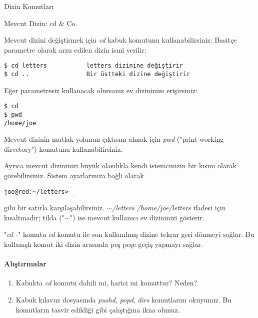 \begin{section}{Dizin Komutları}
\begin{subsection}{Mevcut Dizin: cd \& Co.}

Mevcut dizini değiştirmek için \emph{cd} kabuk komutunu kullanabilirsiniz: Basitçe parametre olarak arzu edilen dizin ismi verilir:
\footnotesize
\begin{verbatim}
$ cd letters 	       letters dizinine değiştirir
$ cd .. 			   Bir üstteki dizine değiştirir
\end{verbatim}
\normalsize 

Eğer parametresiz kullanacak olursanız ev dizininize erişirsiniz:
\footnotesize
\begin{verbatim}
$ cd
$ pwd
/home/joe
\end{verbatim}
\normalsize 

Mevcut dizinin mutlak yolunun çıktısını almak için \emph{pwd} ("print working directory") komutunu kullanabilirsiniz.

Ayrıca mevcut dizininizi büyük olasılıkla kendi istemcinizin bir kısmı olarak görebilirsiniz. Sistem ayarlarınıza bağlı olarak

\footnotesize
\begin{verbatim}
joe@red:~/letters> _
\end{verbatim}
\normalsize 

gibi bir satırla karşılaşabilirsiniz. \emph{$\sim$/letters} \emph{/home/joe/letters} ifadesi için kısaltmadır; tilda ("\emph{$\sim$}") ise mevcut kullanıcı ev dizininizi gösterir. 

"\emph{cd -}" komutu \emph{cd} komutu ile son kullanılmış dizine tekrar geri dönmeyi sağlar. Bu kullanışlı komut iki dizin arasında peş peşe geçiş yapmayı sağlar.

\paragraph{{\Huge{\PencilLeftDown}}Alıştırmalar}{
\begin{enumerate}
 \item Kabukta \emph{cd} komutu dahili mi, harici mi komuttur? Neden?
 \item Kabuk kılavuz dosyasında \emph{pushd}, \emph{popd}, \emph{dirs} komutlarını okuyunuz. Bu komutların tasvir edildiği gibi çalıştığına ikna olunuz.
\end{enumerate}}


\end{subsection}
\end{section}
